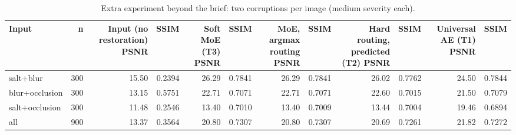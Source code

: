 \begin{table}[t]
\centering
\caption{Extra experiment beyond the brief: two corruptions per image (medium severity each).}
\label{tab:task3_mixed}
\begin{tabular}{lrrrrrrrrrrr}
\toprule
Input & n & Input (no restoration) PSNR & SSIM & Soft MoE (T3) PSNR & SSIM & MoE, argmax routing PSNR & SSIM & Hard routing, predicted (T2) PSNR & SSIM & Universal AE (T1) PSNR & SSIM \\
\midrule
salt+blur & 300 & 15.50 & 0.2394 & 26.29 & 0.7841 & 26.29 & 0.7841 & 26.02 & 0.7762 & 24.50 & 0.7844 \\
blur+occlusion & 300 & 13.15 & 0.5751 & 22.71 & 0.7071 & 22.71 & 0.7071 & 22.60 & 0.7015 & 21.50 & 0.7079 \\
salt+occlusion & 300 & 11.48 & 0.2546 & 13.40 & 0.7010 & 13.40 & 0.7009 & 13.44 & 0.7004 & 19.46 & 0.6894 \\
all & 900 & 13.37 & 0.3564 & 20.80 & 0.7307 & 20.80 & 0.7307 & 20.69 & 0.7261 & 21.82 & 0.7272 \\
\bottomrule
\end{tabular}
\end{table}
